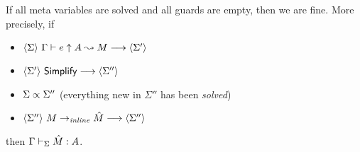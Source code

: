 % 
% 
% 
% 
\begin{theorem}[Soundness]
    If all meta variables are solved and all guards are empty, then we are fine. More precisely, if
    \begin{itemize}
	\item $\langle {\Sigma} \rangle ~{{\Gamma} \vdash {e} \uparrow {A} \leadsto {M}} \longrightarrow \langle {\Sigma'} \rangle$
	\item ${\langle {\Sigma'} \rangle ~{\mathsf{Simplify}} \longrightarrow \langle {\Sigma''} \rangle}$
	\item ${{\Sigma} \propto {\Sigma''}}$ (everything new in $\Sigma''$ has been {\em solved})
	\item ${\langle {\Sigma''} \rangle ~{{M} \to_{\mathit{inline}} {\hat M}} \longrightarrow \langle {\Sigma''} \rangle}$
    \end{itemize}
    then $\Gamma\vdash_{\Sigma}\hat M:A$.
\end{theorem}
